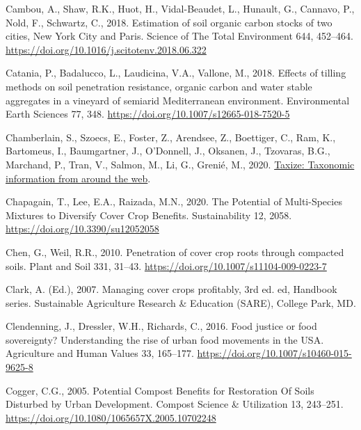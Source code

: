 \documentclass[
  12pt,
]{article}
\newlength{\cslhangindent}
\newlength{\cslentryspacingunit} %
\newenvironment{CSLReferences}[2] %
 {%
  \setlength{\parindent}{0pt}
  \ifodd #1
  \let\oldpar\par
  \def\par{\hangindent=\cslhangindent\oldpar}
  \fi
  \setlength{\parskip}{#2\cslentryspacingunit}
 }%
 {}
\begin{document}
\begin{CSLReferences}{1}{0}
\leavevmode{}%
Cambou, A., Shaw, R.K., Huot, H., Vidal-Beaudet, L., Hunault, G., Cannavo, P., Nold, F., Schwartz, C., 2018. Estimation of soil organic carbon stocks of two cities, {New York City} and {Paris}. Science of The Total Environment 644, 452--464. \url{https://doi.org/10.1016/j.scitotenv.2018.06.322}

\leavevmode{}%
Catania, P., Badalucco, L., Laudicina, V.A., Vallone, M., 2018. Effects of tilling methods on soil penetration resistance, organic carbon and water stable aggregates in a vineyard of semiarid {Mediterranean} environment. Environmental Earth Sciences 77, 348. \url{https://doi.org/10.1007/s12665-018-7520-5}

\leavevmode{}%
Chamberlain, S., Szoecs, E., Foster, Z., Arendsee, Z., Boettiger, C., Ram, K., Bartomeus, I., Baumgartner, J., O'Donnell, J., Oksanen, J., Tzovaras, B.G., Marchand, P., Tran, V., Salmon, M., Li, G., Grenié, M., 2020. \href{https://github.com/ropensci/taxize}{Taxize: Taxonomic information from around the web}.

\leavevmode{}%
Chapagain, T., Lee, E.A., Raizada, M.N., 2020. The {Potential} of {Multi-Species Mixtures} to {Diversify Cover Crop Benefits}. Sustainability 12, 2058. \url{https://doi.org/10.3390/su12052058}

\leavevmode{}%
Chen, G., Weil, R.R., 2010. Penetration of cover crop roots through compacted soils. Plant and Soil 331, 31--43. \url{https://doi.org/10.1007/s11104-009-0223-7}

\leavevmode{}%
Clark, A. (Ed.), 2007. Managing cover crops profitably, 3rd ed. ed, Handbook series. {Sustainable Agriculture Research \& Education (SARE)}, {College Park, MD}.

\leavevmode{}%
Clendenning, J., Dressler, W.H., Richards, C., 2016. Food justice or food sovereignty? {Understanding} the rise of urban food movements in the {USA}. Agriculture and Human Values 33, 165--177. \url{https://doi.org/10.1007/s10460-015-9625-8}

\leavevmode{}%
Cogger, C.G., 2005. Potential {Compost Benefits} for {Restoration Of Soils Disturbed} by {Urban Development}. Compost Science \& Utilization 13, 243--251. \url{https://doi.org/10.1080/1065657X.2005.10702248}


\end{CSLReferences}
\end{document}
